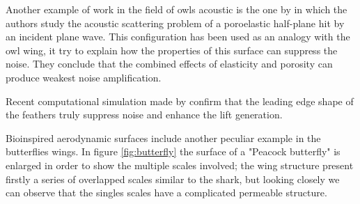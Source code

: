 Another example of work in the field of owls acoustic is the one by \citet{jaworski2013aerodynamic} in which the authors study the acoustic scattering problem of a poroelastic half-plane hit by an incident plane wave.
This configuration has been used as an analogy with the owl wing, it try to explain how the properties of this surface can suppress the noise.
They conclude that the combined effects of elasticity and porosity can produce weakest noise amplification.

Recent computational simulation made by \citet{rao2017owl} confirm that the leading edge shape of the feathers truly suppress noise and enhance the lift generation.

Bioinspired aerodynamic surfaces include another peculiar example in the butterflies wings.
In figure \ref{fig:butterfly} the surface of a "Peacock butterfly" is enlarged in order to show the multiple scales involved; the wing structure present firstly a series of overlapped scales similar to the shark, but looking closely we can observe that the singles scales have a complicated permeable structure.

